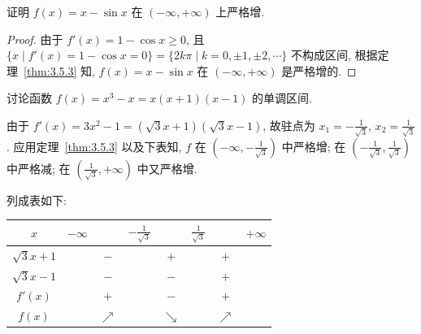 \begin{example}\label{ex:3.5.2}
证明 $f(x)=x-\sin x$ 在 $(-\infty,+\infty)$ 上严格增.
\end{example}

\begin{proof}
由于 $f'(x)=1-\cos x\geqslant 0$, 且 $\{x\mid f'(x)=1-\cos x=0\}=\{2k\pi\mid k=0,\pm 1,\pm 2,\cdots\}$ 不构成区间, 根据定理~\ref{thm:3.5.3} 知, $f(x)=x-\sin x$ 在 $(-\infty,+\infty)$ 是严格增的.
\end{proof}

\begin{example}\label{ex:3.5.3}
讨论函数 $f(x)=x^{3}-x=x(x+1)(x-1)$ 的单调区间.
\end{example}

\begin{solution}
由于 $f'(x)=3x^{2}-1=(\sqrt{3}x+1)(\sqrt{3}x-1)$, 故驻点为 $x_{1}=-\frac{1}{\sqrt{3}}$, $x_{2}=\frac{1}{\sqrt{3}}$. 应用定理~\ref{thm:3.5.3} 以及下表知, $f$ 在 $\left(-\infty,-\frac{1}{\sqrt{3}}\right)$ 中严格增; 在 $\left(-\frac{1}{\sqrt{3}},\frac{1}{\sqrt{3}}\right)$ 中严格减; 在 $\left(\frac{1}{\sqrt{3}},+\infty\right)$ 中又严格增.

列成表如下:
\begin{center}
\begin{tabular}{|c|c|c|c|c|c|c|c|}
\hline
$x$ & $-\infty$ & & $-\frac{1}{\sqrt{3}}$ & & $\frac{1}{\sqrt{3}}$ & & $+\infty$ \\
\hline
$\sqrt{3}x+1$ & & $-$ & & $+$ & & $+$ & \\
\hline
$\sqrt{3}x-1$ & & $-$ & & $-$ & & $+$ & \\
\hline
$f'(x)$ & & $+$ & & $-$ & & $+$ & \\
\hline
$f(x)$ & & $\nearrow$ & & $\searrow$ & & $\nearrow$ & \\
\hline
\end{tabular}
\end{center}


\end{solution}
